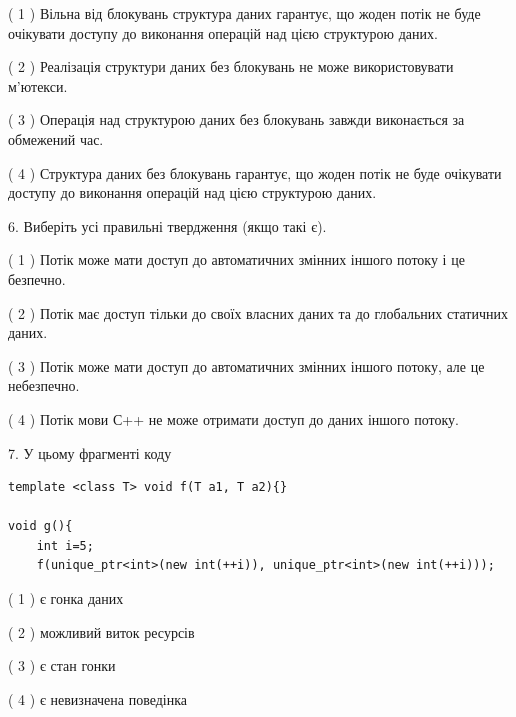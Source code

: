 \documentclass[12pt, ukrainian]{article}
\begin{document}
\begin {large}
{( 1 ) Вільна від блокувань структура даних гарантує, що жоден потік не буде очікувати доступу до виконання операцій над цією структурою даних.%

( 2 ) Реалізація структури даних без блокувань не може використовувати м’ютекси.%

( 3 ) Операція над структурою даних без блокувань завжди виконається за обмежений час.%

( 4 ) Структура даних без блокувань гарантує, що жоден потік не буде очікувати доступу до виконання операцій над цією структурою даних.%
\newpage



\vspace{5mm}
6. Виберіть усі правильні твердження (якщо такі є).\par
\vspace{2mm}

( 1 ) Потік може мати доступ до автоматичних змінних іншого потоку і це безпечно.%

( 2 ) Потік має доступ тільки до своїх власних даних та до глобальних статичних даних.%

( 3 ) Потік може мати доступ до автоматичних змінних іншого потоку, але це небезпечно.%

( 4 ) Потік мови С++ не може отримати доступ до даних іншого потоку.%


\vspace{5mm}
7. У цьому фрагменті коду
\begin{verbatim}
template <class T> void f(T a1, T a2){}

void g(){
    int i=5;
    f(unique_ptr<int>(new int(++i)), unique_ptr<int>(new int(++i)));
\end{verbatim}

( 1 ) є гонка даних%

( 2 ) можливий виток ресурсів%

( 3 ) є стан гонки%

( 4 ) є невизначена поведінка%
}
\end {large}
\end{document}

